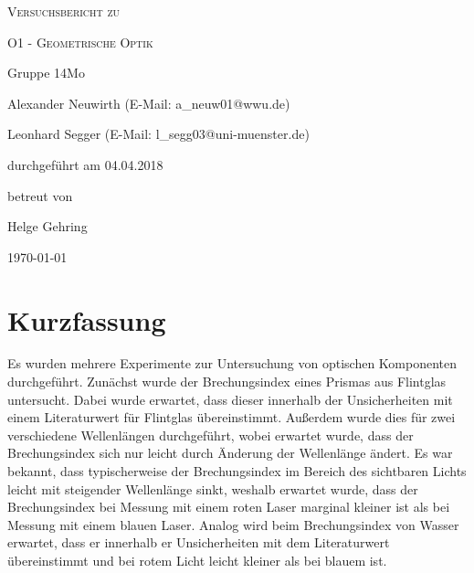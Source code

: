 \documentclass[
	a4paper,
	12pt,
	pagesize,
	ngerman
]{scrartcl}
\begin{document}
	
	\begin{titlepage}
		\centering
		{\scshape\LARGE Versuchsbericht zu \par}
		\vspace{1cm}
		{\scshape\huge O1 - Geometrische Optik \par}
		\vspace{2.5cm}
		{\LARGE Gruppe 14Mo \par}
		\vspace{0.5cm}
		
		{\large Alexander Neuwirth (E-Mail: a\_neuw01@wwu.de) \par}
		{\large Leonhard Segger (E-Mail: l\_segg03@uni-muenster.de) \par}
		\vfill
		
		durchgeführt am 04.04.2018\par
		betreut von\par
		{\large Helge Gehring} 
		
		\vfill
		
		{\large \today\par}
	\end{titlepage}
	\tableofcontents
	\newpage


	\section{Kurzfassung}
	Es wurden mehrere Experimente zur Untersuchung von optischen Komponenten durchgeführt.
	Zunächst wurde der Brechungsindex eines Prismas aus Flintglas untersucht.
	Dabei wurde erwartet, dass dieser innerhalb der Unsicherheiten mit einem Literaturwert für Flintglas übereinstimmt. %
	Außerdem wurde dies für zwei verschiedene Wellenlängen durchgeführt, wobei erwartet wurde, dass der Brechungsindex sich nur leicht durch Änderung der Wellenlänge ändert.
	Es war bekannt, dass typischerweise der Brechungsindex im Bereich des sichtbaren Lichts leicht mit steigender Wellenlänge sinkt, weshalb erwartet wurde, dass der Brechungsindex bei Messung mit einem roten Laser marginal kleiner ist als bei Messung mit einem blauen Laser. %
	Analog wird beim Brechungsindex von Wasser erwartet, dass er innerhalb er Unsicherheiten mit dem Literaturwert übereinstimmt und bei rotem Licht leicht kleiner als bei blauem ist.
	
\end{document}
